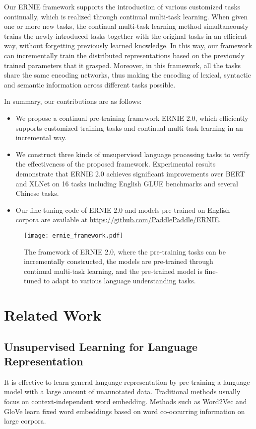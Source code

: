\documentclass[letterpaper]{article} \usepackage{aaai20}  \usepackage{times}  \usepackage{helvet} \usepackage{courier}  \usepackage[hyphens]{url}  \usepackage{graphicx} \usepackage{makecell}
\begin{document}
Our ERNIE framework supports the introduction of various customized tasks continually, which is realized through continual multi-task learning. When given one or more new tasks, the continual multi-task learning method simultaneously trains the newly-introduced tasks together with the original tasks in an efficient way, without forgetting previously learned knowledge. In this way, our framework can incrementally train the distributed representations based on the previously trained parameters that it grasped. Moreover, in this framework, all the tasks share the same encoding networks, thus making the encoding of lexical, syntactic and semantic information across different tasks possible.

In summary, our contributions are as follows:
\begin{itemize}
    \item We propose a continual pre-training framework ERNIE 2.0, which efficiently supports customized training tasks and continual multi-task learning in an incremental way.
    \item We construct three kinds of unsupervised language processing tasks to verify the effectiveness of the proposed framework. Experimental results demonstrate that ERNIE 2.0 achieves significant improvements over BERT and XLNet on 16 tasks including English GLUE benchmarks and several Chinese tasks. 
    \item Our fine-tuning code of ERNIE 2.0 and models pre-trained on English corpora are available at \url{https://github.com/PaddlePaddle/ERNIE}.
\end{itemize}

\begin{figure*} 
\centerline
{\texttt{[image: ernie\_framework.pdf]}}
\caption{The framework of ERNIE 2.0, where the pre-training tasks can be incrementally constructed, the models are pre-trained through continual multi-task learning, and the pre-trained model is fine-tuned to adapt to various language understanding tasks.}
\label{the framework of ERNIE}
\end{figure*}

\section{Related Work}
\subsection{Unsupervised Learning for Language Representation}
It is effective to learn general language representation by pre-training a language model with a large amount of unannotated data. Traditional methods usually focus on context-independent word embedding. Methods such as Word2Vec \cite{mikolov2013efficient} and GloVe \cite{pennington2014glove} learn fixed word embeddings based on word co-occurring information on large corpora.
\end{document}
